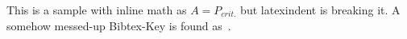This is a sample with inline math as $A=P_{crit.}$ but latexindent is breaking it.
A somehow messed-up Bibtex-Key is found as~\cite{Bibtex..2025}.
